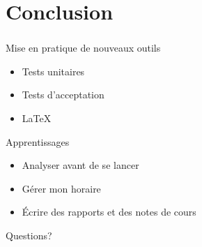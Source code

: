 \documentclass{beamer}
\begin{document}
  \section[Conclusion]{Conclusion}
  \begin{frame}
  \frametitle{\insertsection}
  \begin{block}{Mise en pratique de nouveaux outils}
  \begin{itemize}
    \item Tests unitaires
    \item Tests d'acceptation
    \item \LaTeX
  \end{itemize}
  \end{block}
  
  \begin{block}{Apprentissages}
  \begin{itemize}
    \item Analyser avant de se lancer
    \item G\'erer mon horaire
    \item \'Ecrire des rapports et des notes de cours
  \end{itemize}
  \end{block}
  \end{frame}
  
  \begin{frame}
  \begin{center}
  \Huge Questions?
  \end{center}
  \end{frame}
\end{document}
